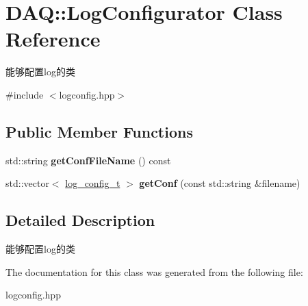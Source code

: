 \hypertarget{classDAQ_1_1LogConfigurator}{}\section{D\+AQ\+:\+:Log\+Configurator Class Reference}
\label{classDAQ_1_1LogConfigurator}


能够配置log的类  




{\ttfamily \#include $<$logconfig.\+hpp$>$}

\subsection*{Public Member Functions}
\begin{DoxyCompactItemize}
\item 
\mbox{\label{classDAQ_1_1LogConfigurator_a9b91e264f2a5c88918c60a58c6f8194c}} 
std\+::string {\bfseries get\+Conf\+File\+Name} () const
\item 
\mbox{\label{classDAQ_1_1LogConfigurator_abfc49c8e2dafb364cbdc1c8eeb97d9ce}} 
std\+::vector$<$ \hyperlink{structDAQ_1_1LogConfigStruct}{log\+\_\+config\+\_\+t} $>$ {\bfseries get\+Conf} (const std\+::string \&filename)
\end{DoxyCompactItemize}


\subsection{Detailed Description}
能够配置log的类 

The documentation for this class was generated from the following file\+:\begin{DoxyCompactItemize}
\item 
logconfig.\+hpp\end{DoxyCompactItemize}
